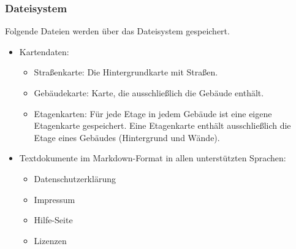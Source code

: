 \subsubsection{Dateisystem}
Folgende Dateien werden über das Dateisystem gespeichert.
\begin{itemize}
    \item Kartendaten:
    \begin{itemize}
        \item Straßenkarte: Die Hintergrundkarte mit Straßen.
        \item Gebäudekarte: Karte, die ausschließlich die Gebäude enthält.
        \item Etagenkarten: Für jede Etage in jedem Gebäude ist eine eigene Etagenkarte gespeichert. 
        Eine Etagenkarte enthält ausschließlich die Etage eines Gebäudes (Hintergrund und Wände).
    \end{itemize}
    \item Textdokumente im Markdown-Format in allen unterstützten Sprachen:
    \begin{itemize}
        \item Datenschutzerklärung
        \item Impressum
        \item Hilfe-Seite
        \item Lizenzen
    \end{itemize}
\end{itemize}